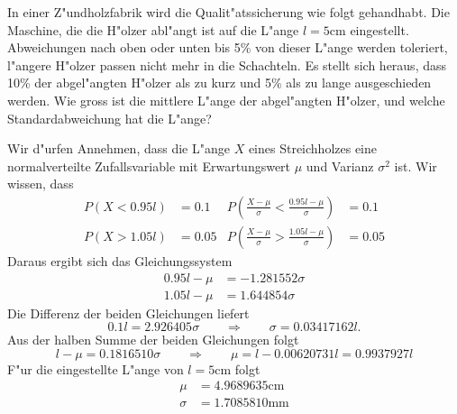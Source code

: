 In einer Z"undholzfabrik wird die Qualit"atssicherung wie folgt gehandhabt.
Die Maschine, die die H"olzer abl"angt ist auf die L"ange $l=5\text{cm}$ eingestellt.
Abweichungen nach oben oder unten bis 5\% von dieser L"ange werden toleriert,
l"angere H"olzer passen nicht mehr in die Schachteln. Es stellt sich
heraus, dass 10\% der abgel"angten H"olzer als zu kurz und 5\% als zu
lange ausgeschieden werden. Wie gross ist die mittlere L"ange der abgel"angten
H"olzer, und welche Standardabweichung hat die L"ange?

\begin{loesung}
Wir d"urfen Annehmen, dass die L"ange $X$ eines Streichholzes eine
normalverteilte Zufallsvariable mit Erwartungswert $\mu$ und Varianz
$\sigma^2$ ist. Wir wissen, dass
\begin{align*}
P(X<0.95 l)&=0.1&P\left(\frac{X-\mu}{\sigma}<\frac{0.95l-\mu}{\sigma}\right)&=0.1\\
P(X>1.05l)&=0.05&P\left(\frac{X-\mu}{\sigma}>\frac{1.05l-\mu}{\sigma}\right)&=0.05
\end{align*}
Daraus ergibt sich das Gleichungssystem
\begin{align*}
0.95l-\mu&=-1.281552\sigma\\
1.05l-\mu&=1.644854\sigma
\end{align*}
Die Differenz der beiden Gleichungen liefert
\[
0.1l=2.926405\sigma\qquad\Rightarrow\qquad
\sigma=0.03417162l.
\]
Aus der halben Summe der beiden Gleichungen folgt
\[
l-\mu=0.1816510\sigma\qquad\Rightarrow\qquad\mu=l-0.00620731l
=0.9937927l
\]
F"ur die eingestellte L"ange von $l=5\text{cm}$ folgt
\begin{align*}
\mu&=
4.9689635
\text{cm}
\\
\sigma&=
1.7085810
\text{mm}
\end{align*}
\end{loesung}


